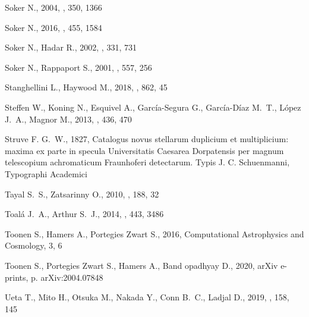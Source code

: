 \documentclass[useAMS, usenatbib]{mnras}
\begin{document}
\begin{thebibliography}{}
{Soker} N.,  2004, \mnras, 350, 1366

{Soker} N.,  2016, \mnras, 455, 1584

{Soker} N.,  {Hadar} R.,  2002, \mnras, 331, 731

{Soker} N.,  {Rappaport} S.,  2001, \apj, 557, 256

{Stanghellini} L.,  {Haywood} M.,  2018, \apj, 862, 45

{Steffen} W.,  {Koning} N.,  {Esquivel} A.,  {García-Segura} G.,
  {García-Díaz} M.~T.,  {López} J.~A.,   {Magnor} M.,  2013, \mnras, 436,
  470

Struve F. G.~W.,  1827, Catalogus novus stellarum duplicium et multiplicium:
  maxima ex parte in specula Universitatis Caesarea Dorpatensis per magnum
  telescopium achromaticum Fraunhoferi detectarum.
Typis J. C. Schuenmanni, Typographi Academici

{Tayal} S.~S.,  {Zatsarinny} O.,  2010, \apjs, 188, 32

{Toalá} J.~A.,  {Arthur} S.~J.,  2014, \mnras, 443, 3486

{Toonen} S.,  {Hamers} A.,   {Portegies Zwart} S.,  2016, Computational
  Astrophysics and Cosmology, 3, 6

{Toonen} S.,  {Portegies Zwart} S.,  {Hamers} A.,   {Band opadhyay} D.,  2020,
  arXiv e-prints, p. arXiv:2004.07848

{Ueta} T.,  {Mito} H.,  {Otsuka} M.,  {Nakada} Y.,  {Conn} B.~C.,   {Ladjal}
  D.,  2019, \aj, 158, 145


\end{thebibliography}
\end{document}
